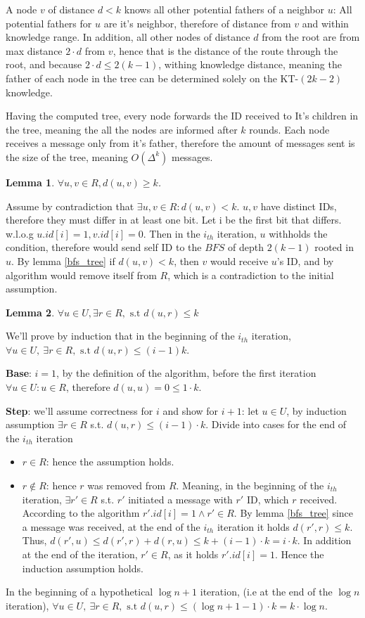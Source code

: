 \documentclass[11pt]{article}
\newtheorem{lemma}{Lemma}
\begin{document}
A node $v$ of distance $d<k$ knows all other potential fathers of a neighbor $u$: 
All potential fathers for $u$ are it's neighbor, therefore of distance from $v$ and within knowledge range. In addition, all other nodes of distance $d$ from the root are from max distance $2\cdot d$ from $v$, hence that is the distance of the route through the root, and because $2\cdot d\le 2(k-1)$, withing knowledge distance, meaning the father of each node in the tree can be determined solely on the KT-$(2k-2)$ knowledge.


Having the computed tree, every node forwards the ID received to It's children in the tree, meaning the all the nodes are informed after $k$ rounds. Each node receives a message only from it's father, therefore the amount of messages sent is the size of the tree, meaning $O(\Delta^k)$ messages.

\begin{lemma}
\label{alpha_rule}
$\forall u,v \in R, d(u,v) \ge k$.
\end{lemma}
Assume by contradiction that $\exists u,v\in R: d(u,v)<k$.
$u,v$ have distinct IDs, therefore they must differ in at least one bit. Let i be the first bit that differs. w.l.o.g $u.id[i]=1, v.id[i]=0$. Then in the $i_{th}$ iteration, $u$ withholds the condition, therefore would send self ID to the $BFS$ of depth $2(k-1)$ rooted in $u$. By lemma \ref{bfs_tree} if $d(u,v)<k$, then $v$ would receive $u$'s ID, and by algorithm would remove itself from $R$, which is a contradiction to the initial assumption.

\begin{lemma}
\label{beta_rule}
$\forall u\in U,\exists r\in R, \text{ s.t } d(u,r) \le k$
\end{lemma}
We'll prove by induction that in the beginning of the $i_{th}$ iteration, $\forall u \in U,\: \exists r\in R, \text{ s.t } d(u,r) \le (i-1)k$.

\textbf{Base}: $i=1$, by the definition of the algorithm, before the first iteration $\forall u\in U: u\in R$, therefore $d(u,u)=0\le 1 \cdot k$.


\textbf{Step}: we’ll assume correctness for $i$ and show for $i+1$:
let $u\in U$, by induction assumption $\exists r\in R$ s.t. $d(u,r)\le (i-1)\cdot k$. Divide into cases for the end of the $i_{th}$ iteration
\begin{itemize}
    \item $r\in R$: hence the assumption holds.
    \item $r \notin R$: hence $r$ was removed from $R$. Meaning, in the beginning of the $i_{th}$ iteration, $\exists r'\in R$ s.t. $r'$ initiated a message with $r'$ ID, which $r$ received. According to the algorithm $r'.id[i]=1 \land r'\in R$. By lemma \ref{bfs_tree} since a message was received, at the end of the $i_{th}$ iteration it holds $d(r',r)\le k$. Thus, $d(r',u)\le d(r',r)+d(r,u)\le k+(i-1)\cdot k=i\cdot k$. In addition at the end of the iteration, $r' \in R$, as it holds $r'.id[i]=1$. Hence the induction assumption holds.
\end{itemize}
In the beginning of a hypothetical $\log{n}+1$ iteration, (i.e at the end of the $\log{n}$ iteration), $\forall u\in U, \: \exists r\in R, \text{ s.t } d(u,r) \le (\log{n}+1-1)\cdot k = k\cdot\log{n}$.
\end{document}
